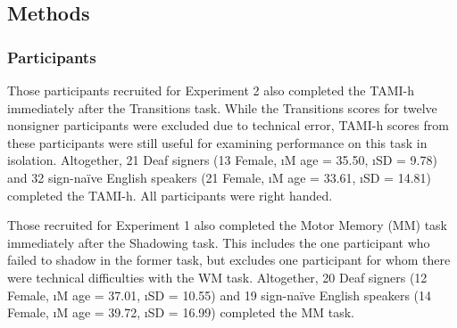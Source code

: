     \subsection{Methods} \label{sec:supp_meth}
        \subsubsection{Participants}
            Those participants recruited for Experiment 2 also completed the TAMI-h immediately after the Transitions task. While the Transitions scores for twelve nonsigner participants were excluded due to technical error, TAMI-h scores from these participants were still useful for examining performance on this task in isolation. Altogether, 21 Deaf signers (13 Female, \i{M} age = 35.50, \i{SD} = 9.78) and 32 sign-na\"ive English speakers (21 Female, \i{M} age = 33.61, \i{SD} = 14.81) completed the TAMI-h. All participants were right handed. \par
            Those recruited for Experiment 1 also completed the Motor Memory (MM) task immediately after the Shadowing task. This includes the one participant who failed to shadow in the former task, but excludes one participant for whom there were technical difficulties with the WM task. Altogether, 20 Deaf signers (12 Female, \i{M} age = 37.01, \i{SD} = 10.55) and 19 sign-na\"ive English speakers (14 Female, \i{M} age = 39.72, \i{SD} = 16.99) completed the MM task. \par
